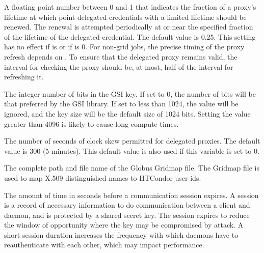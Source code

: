 \begin{description}
\label{param:DelegateJobGSICredentialsRefresh}
\item[\Macro{DELEGATE\_JOB\_GSI\_CREDENTIALS\_REFRESH}]
  A floating point number between 0 and 1 that indicates the fraction of 
  a proxy's lifetime at which point delegated
  credentials with a limited lifetime should be renewed.  
  The renewal is attempted periodically at or near the specified fraction
  of the lifetime of the delegated credential.  
  The default value is 0.25.
  This setting has no effect if  is 
   or if
   is 0.  
  For non-grid jobs, the precise timing of the proxy refresh depends on
  .  
  To ensure that the delegated proxy remains valid, 
  the interval for checking the proxy should be,
  at most, half of the interval for refreshing it.

\label{param:GSIDelegationKeybits}
\item[\Macro{GSI\_DELEGATION\_KEYBITS}]
  The integer number of bits in the GSI key.
  If set to 0, the number of bits will be that preferred by the GSI library.
  If set to less than 1024, the value will be ignored, and the key size
  will be the default size of 1024 bits.
  Setting the value greater than 4096 is likely to cause long compute times.

\label{param:GSIDelegationClockSkewAllowable}
\item[\Macro{GSI\_DELEGATION\_CLOCK\_SKEW\_ALLOWABLE}]
  The number of seconds of clock skew permitted for delegated proxies.
  The default value is 300 (5 minutes).  This default value is also used
  if this variable is set to 0.
  
\label{param:GridMap}
\item[\Macro{GRIDMAP}]
  The complete path and file name of the Globus Gridmap file.
  The Gridmap file is used to map
  X.509 distinguished names to HTCondor user ids.

\label{param:SecDefaultSessionDuration}
\item[\Macro{SEC\_<access-level>\_SESSION\_DURATION}]
  The amount of time in seconds before
  a communication session expires.
  A session is a record of necessary information to do communication
  between a client and daemon, and is protected by a shared secret key.
  The session expires to reduce the window of opportunity where
  the key may be compromised by attack.  A short session duration
  increases the frequency with which daemons have to reauthenticate
  with each other, which may impact performance.


\end{description}
